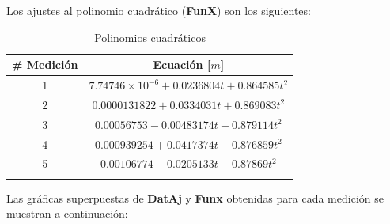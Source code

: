 \documentclass[12pt, titlepage]{report}
\begin{document}
    Los ajustes al polinomio cuadrático (\textbf{FunX}) son los siguientes:

    \begin{longtable}{|c|c|}
        \hline
        \# Medición & Ecuación [$m$] \\ \hline
        1 & $7.74746\times10^{-6} + 0.0236804 t + 0.864585 t^2$ \\ \hline
        2 & $0.0000131822 + 0.0334031 t + 0.869083 t^2$ \\ \hline
        3 & $0.00056753 - 0.00483174 t + 0.879114 t^2$ \\ \hline
        4 & $0.000939254 + 0.0417374 t + 0.876859 t^2$ \\ \hline
        5 & $0.00106774 - 0.0205133 t + 0.87869 t^2$ \\ \hline
        \caption{Polinomios cuadráticos}
    \end{longtable}

    \newpage
    Las gráficas superpuestas de \textbf{DatAj} y \textbf{Funx} obtenidas para cada medición se muestran a continuación:
\end{document}
